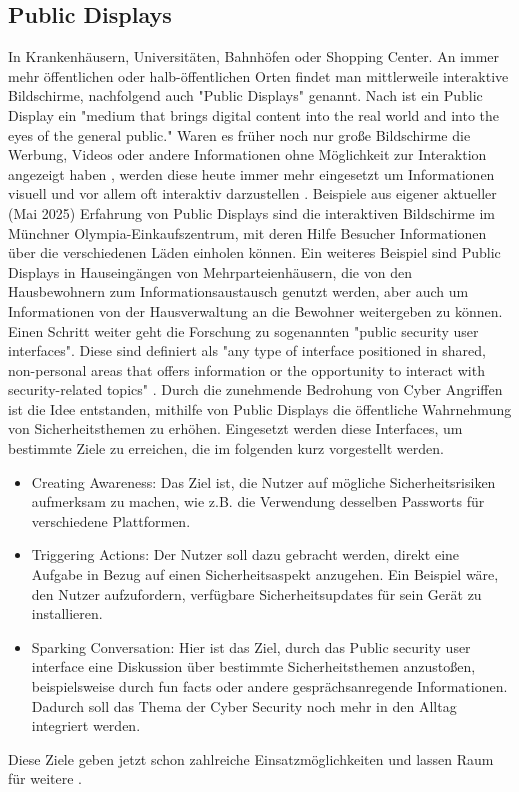 \subsection{Public Displays}
In Krankenhäusern, Universitäten, Bahnhöfen oder Shopping Center. 
An immer mehr öffentlichen oder halb-öffentlichen Orten findet man mittlerweile interaktive Bildschirme, 
nachfolgend auch "Public Displays" genannt. Nach \textcite{parkerDoesPublicStill2018} ist ein Public Display 
ein "medium that brings digital content into the real world and into the eyes of the general public." \cite{parkerDoesPublicStill2018} 
Waren es früher noch nur große Bildschirme die Werbung, Videos oder andere Informationen ohne Möglichkeit zur Interaktion angezeigt haben \cite{PDFEnticingPeople}, 
werden diese heute immer mehr eingesetzt um Informationen visuell und vor allem oft interaktiv darzustellen \cite{hinrichsInteractivePublicDisplays2013}. 
Beispiele aus eigener aktueller (Mai 2025) Erfahrung von Public Displays sind die interaktiven Bildschirme im Münchner Olympia-Einkaufszentrum, 
mit deren Hilfe Besucher Informationen über die verschiedenen Läden einholen können. 
Ein weiteres Beispiel sind Public Displays in Hauseingängen von Mehrparteienhäusern, 
die von den Hausbewohnern zum Informationsaustausch genutzt werden, aber auch um Informationen von der Hausverwaltung an die Bewohner weitergeben zu können.
Einen Schritt weiter geht die Forschung zu sogenannten "public security user interfaces". 
Diese sind definiert als "any type of interface positioned in shared, 
non-personal areas that offers information or the opportunity to interact with security-related topics" \cite{murtezajPublicSecurityUser2025}. 
Durch die zunehmende Bedrohung von Cyber Angriffen ist die Idee entstanden, mithilfe von Public Displays die öffentliche Wahrnehmung von Sicherheitsthemen zu erhöhen. 
Eingesetzt werden diese Interfaces, um bestimmte Ziele zu erreichen, die im folgenden kurz vorgestellt werden.
\begin{itemize}
    \item Creating Awareness: Das Ziel ist, die Nutzer auf mögliche Sicherheitsrisiken aufmerksam zu machen, wie z.B. die Verwendung desselben Passworts für verschiedene Plattformen.
    \item Triggering Actions: Der Nutzer soll dazu gebracht werden, direkt eine Aufgabe in Bezug auf einen Sicherheitsaspekt anzugehen. 
        Ein Beispiel wäre, den Nutzer aufzufordern, verfügbare Sicherheitsupdates für sein Gerät zu installieren.
    \item Sparking Conversation: Hier ist das Ziel, durch das Public security user interface eine Diskussion über bestimmte Sicherheitsthemen anzustoßen, 
        beispielsweise durch fun facts oder andere gesprächsanregende Informationen. 
        Dadurch soll das Thema der Cyber Security noch mehr in den Alltag integriert werden.
\end{itemize}
Diese Ziele geben jetzt schon zahlreiche Einsatzmöglichkeiten und lassen Raum für weitere \cite{murtezajPublicSecurityUser2025}.

